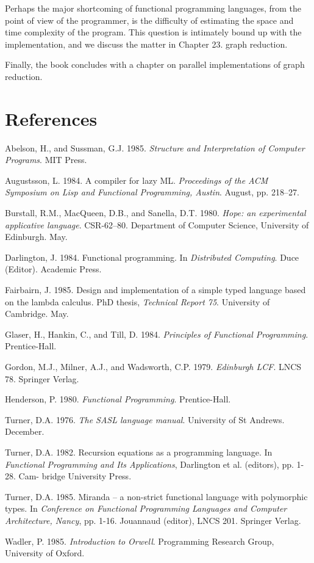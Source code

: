 Perhaps the major shortcoming of functional programming languages,
from the point of view of the programmer, is the difficulty of estimating the
space and time complexity of the program. This question is intimately bound
up with the implementation, and we discuss the matter in Chapter 23.
graph reduction.

Finally, the book concludes with a chapter on parallel implementations of
graph reduction.

\pg

\section*{References}

\begin{references}
	\item Abelson, H., and Sussman, G.J. 1985. \textit{Structure and Interpretation of Computer
	Programs}. MIT Press.
	\item  Augustsson, L. 1984. A compiler for lazy ML. \textit{Proceedings of the ACM Symposium on
	Lisp and Functional Programming, Austin}. August, pp. 218--27.
	\item Burstall, R.M., MacQueen, D.B., and Sanella, D.T. 1980. \textit{Hope: an experimental
	applicative language}. CSR-62--80. Department of Computer Science, University of
	Edinburgh. May.
	\item  Darlington, J. 1984. Functional programming. In \textit{Distributed Computing}. Duce
(Editor). Academic Press.
	\item  Fairbairn, J. 1985. Design and implementation of a simple typed language based on the
lambda calculus. PhD thesis, \textit{Technical Report 75}. University of Cambridge. May.
	\item  Glaser, H., Hankin, C., and Till, D. 1984. \textit{Principles of Functional Programming}.
Prentice-Hall.
	\item  Gordon, M.J., Milner, A.J., and Wadsworth, C.P. 1979. \textit{Edinburgh LCF}. LNCS 78.
Springer Verlag.
	\item  Henderson, P. 1980. \textit{Functional Programming}. Prentice-Hall.
	\item  Turner, D.A. 1976. \textit{The SASL language manual}. University of St Andrews. December.
	\item  Turner, D.A. 1982. Recursion equations as a programming language. In \textit{Functional
Programming and Its Applications}, Darlington et al. (editors), pp. 1-28. Cam-
bridge University Press.
	\item  Turner, D.A. 1985. Miranda -- a non-strict functional language with polymorphic
types. In \textit{Conference on Functional Programming Languages and Computer
Architecture, Nancy}, pp. 1-16. Jouannaud (editor), LNCS 201. Springer Verlag.
	\item  Wadler, P. 1985. \textit{Introduction to Orwell}. Programming Research Group, University of
Oxford.
\end{references}
